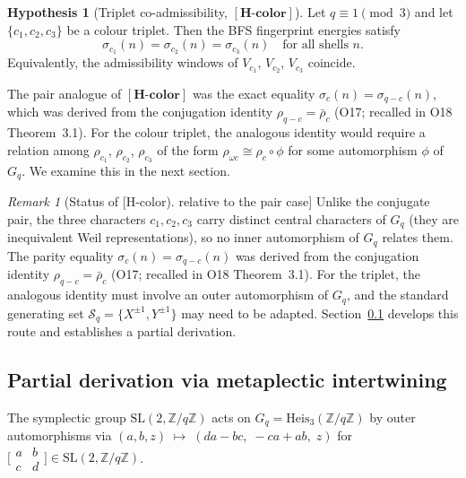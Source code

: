 \documentclass[11pt,a4paper]{article}
\theoremstyle{definition}
\newtheorem{hypothesis}[theorem]{Hypothesis}
\theoremstyle{remark}
\newtheorem{remark}[theorem]{Remark}
\newcommand{\Heis}{\mathrm{Heis}}
\newcommand{\Hcolor}{\mathbf{[H\text{-}color]}}
\newcommand{\Gq}{G_q}
\newcommand{\Z}{\mathbb{Z}}
\newcommand{\Sq}{\mathcal{S}_q}
\begin{document}
      \begin{hypothesis}[Triplet co-admissibility, $\Hcolor$]
        \label{hyp:h-color}
        Let $q \equiv 1 \pmod 3$ and let $\{c_1, c_2, c_3\}$ be a colour triplet.
        Then the BFS fingerprint energies satisfy
        \begin{equation}
          \label{eq:h-color}
          \sigma_{c_1}(n) = \sigma_{c_2}(n) = \sigma_{c_3}(n) \quad \text{for all shells } n.
        \end{equation}
        Equivalently, the admissibility windows of $V_{c_1}$, $V_{c_2}$, $V_{c_3}$ coincide.
      \end{hypothesis}

      The pair analogue of $\Hcolor$ was the exact equality $\sigma_c(n) = \sigma_{q-c}(n)$, which
      was derived from the conjugation identity $\rho_{q-c} = \bar{\rho}_c$ (O17; recalled in
      O18 Theorem~3.1).
      For the colour triplet, the analogous identity would require a relation among $\rho_{c_1}$,
      $\rho_{c_2}$, $\rho_{c_3}$ of the form $\rho_{\omega c} \cong \rho_c \circ \phi$ for some
      automorphism $\phi$ of $\Gq$.
      We examine this in the next section.

      \begin{remark}[Status of [H-color] relative to the pair case]
        \label{rmk:non-trivial}
        Unlike the conjugate pair, the three characters $c_1, c_2, c_3$ carry distinct central
        characters of $\Gq$ (they are inequivalent Weil representations), so no inner automorphism of
        $\Gq$ relates them.
        The parity equality $\sigma_c(n) = \sigma_{q-c}(n)$ was derived from the conjugation identity
        $\rho_{q-c} = \bar{\rho}_c$ (O17; recalled in O18 Theorem~3.1).
        For the triplet, the analogous identity must involve an outer automorphism of $\Gq$, and the
        standard generating set $\Sq = \{X^{\pm 1}, Y^{\pm 1}\}$ may need to be adapted.
        Section~\ref{ssec:metaplectic} develops this route and establishes a partial derivation.
      \end{remark}

    \subsection{Partial derivation via metaplectic intertwining}
      \label{ssec:metaplectic}

      The symplectic group $\mathrm{SL}(2, \Z/q\Z)$ acts on $\Gq = \Heis_3(\Z/q\Z)$ by outer
      automorphisms via
      $(a, b, z) \;\longmapsto\; (da - bc,\; -ca + ab,\; z)$ for
      $\bigl[\begin{smallmatrix}a & b \\ c & d\end{smallmatrix}\bigr] \in \mathrm{SL}(2,\Z/q\Z)$.
\end{document}
